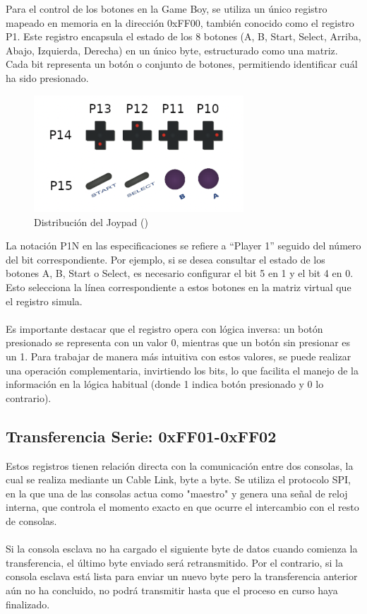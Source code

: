 Para el control de los botones en la Game Boy, se utiliza un único registro mapeado en memoria en la dirección 0xFF00, también conocido como el registro P1. Este registro encapsula el estado de los 8 botones (A, B, Start, Select, Arriba, Abajo, Izquierda, Derecha) en un único byte, estructurado como una matriz. Cada bit representa un botón o conjunto de botones, permitiendo identificar cuál ha sido presionado.

\begin{figure}[H]
    \centering
    \includegraphics[width=0.7\textwidth]{include/images/joypad.png}
    \caption{Distribución del Joypad (\cite{goldensacra})}
    \label{figure:joypad}
\end{figure}

La notación P1N en las especificaciones se refiere a “Player 1” seguido del número del bit correspondiente. Por ejemplo, si se desea consultar el estado de los botones A, B, Start o Select, es necesario configurar el bit 5 en 1 y el bit 4 en 0. Esto selecciona la línea correspondiente a estos botones en la matriz virtual que el registro simula.
\\\\
Es importante destacar que el registro opera con lógica inversa: un botón presionado se representa con un valor 0, mientras que un botón sin presionar es un 1. Para trabajar de manera más intuitiva con estos valores, se puede realizar una operación complementaria, invirtiendo los bits, lo que facilita el manejo de la información en la lógica habitual (donde 1 indica botón presionado y 0 lo contrario).

\subsection{Transferencia Serie: 0xFF01-0xFF02}

Estos registros tienen relación directa con la comunicación entre dos consolas, la cual se realiza mediante un Cable Link, byte a byte. Se utiliza el protocolo SPI, en la que una de las consolas actua como "maestro" y genera una señal de reloj interna, que controla el momento exacto en que ocurre el intercambio con el resto de consolas.
\\\\
Si la consola esclava no ha cargado el siguiente byte de datos cuando comienza la transferencia, el último byte enviado será retransmitido. Por el contrario, si la consola esclava está lista para enviar un nuevo byte pero la transferencia anterior aún no ha concluido, no podrá transmitir hasta que el proceso en curso haya finalizado.

